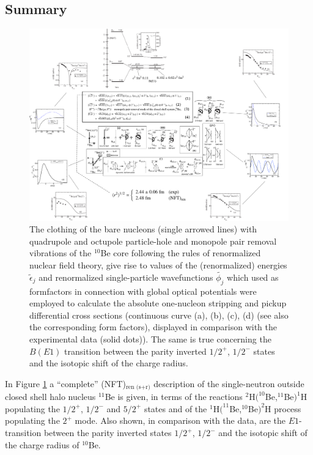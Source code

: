 \subsection{Summary}\label{S5.2.3}
\begin{figure}
	\centerline{\includegraphics*[width=19.5cm,angle=0]{C8/figsC8/Fig6_3_1_v2}}
	\caption{  The clothing of the bare nucleons (single arrowed lines) with quadrupole and octupole particle-hole and monopole pair removal vibrations of the $^{10}$Be core following the rules of renormalized nuclear field theory, give rise to values of the (renormalized) energies $\tilde\epsilon_j$  and renormalized single-particle wavefunctions $\tilde{\phi_j}$ which used as formfactors in connection with global optical potentials were employed to calculate  the absolute one-nucleon stripping and pickup differential cross sections (continuous curve (a), (b), (c), (d) (see also the corresponding form factors), displayed in comparison with the experimental data (solid dots)). The same is true concerning the $B(E1)$ transition between the parity inverted $1/2^+$, $1/2^-$ states and the isotopic shift of the charge radius.}\label{fig6.3.1}
\end{figure} 
In Figure \ref{fig6.3.1} a ``complete'' (NFT)$_{\text{ren (s+r)}}$ description of the single-neutron outside closed shell halo nucleus $^{11}$Be is given, in terms of the reactions $^2$H$(^{10}$Be,$^{11}$Be$ )^1$H populating the $1/2^+$, $1/2^-$ and $5/2^+$ states and of the $^1$H$(^{11}$Be,$^{10}$Be$)^2$H process populating the $2^+$ mode. Also shown, in comparison with the data, are the $E1$-transition between the parity inverted states $1/2^+$, $1/2^-$ and the isotopic shift of the charge radius of $^{10}$Be. 


